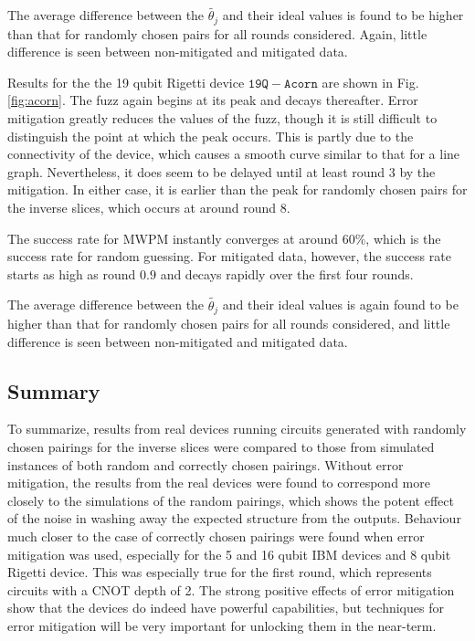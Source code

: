 \documentclass[aps,prl,twocolumn,showpacs,preprintnumbers]{revtex4-1}
\begin{document}
The average difference between the $\tilde{\theta_j}$ and their ideal values is found to be higher than that for randomly chosen pairs for all rounds considered. Again, little difference is seen between non-mitigated and mitigated data.

Results for the the 19 qubit Rigetti device $\mathtt{19Q-Acorn}$ are shown in Fig. \ref{fig:acorn}. The fuzz again begins at its peak and decays thereafter. Error mitigation greatly reduces the values of the fuzz, though it is still difficult to distinguish the point at which the peak occurs. This is partly due to the connectivity of the device, which causes a smooth curve similar to that for a line graph. Nevertheless, it does seem to be delayed until at least round 3 by the mitigation. In either case, it is earlier than the peak for randomly chosen pairs for the inverse slices, which occurs at around round 8.

The success rate for MWPM instantly converges at around $60\%$, which is the success rate for random guessing. For mitigated data, however, the success rate starts as high as round $0.9$ and decays rapidly over the first four rounds.

The average difference between the $\tilde{\theta_j}$ and their ideal values is again found to be higher than that for randomly chosen pairs for all rounds considered, and little difference is seen between non-mitigated and mitigated data.

\subsection{Summary}

To summarize, results from real devices running circuits generated with randomly chosen pairings for the inverse slices were compared to those from simulated instances of both random and correctly chosen pairings. Without error mitigation, the results from the real devices were found to correspond more closely to the simulations of the random pairings, which shows the potent effect of the noise in washing away the expected structure from the outputs. Behaviour much closer to the case of correctly chosen pairings were found when error mitigation was used, especially for the 5 and 16 qubit IBM devices and 8 qubit Rigetti device. This was especially true for the first round, which represents circuits with a CNOT depth of 2. The strong positive effects of error mitigation show that the devices do indeed have powerful capabilities, but techniques for error mitigation will be very important for unlocking them in the near-term.
\end{document}
